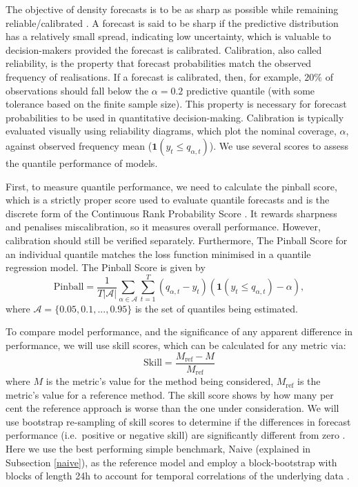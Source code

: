 \documentclass[]{elsarticle} %
\begin{document}
The objective of density forecasts is to be as sharp as possible while
remaining reliable/calibrated \citep{gneiting2007probabilistic}. A forecast
is said to be sharp if the predictive distribution has a relatively
small spread, indicating low uncertainty, which is valuable to
decision-makers provided the forecast is calibrated. Calibration, also
called reliability, is the property that forecast probabilities match
the observed frequency of realisations. If a forecast is calibrated,
then, for example, \(20\%\) of observations should fall below the
\(\alpha=0.2\) predictive quantile (with some tolerance based on the
finite sample size). This property is necessary for forecast
probabilities to be used in quantitative decision-making. Calibration is
typically evaluated visually using reliability diagrams, which plot the
nominal coverage, \(\alpha\), against observed frequency mean
(\(\mathbf{1}(y_{t}\leq q_{\alpha,t})\)). We use several scores to assess
the quantile performance of models.

First, to measure quantile performance, we need to calculate the pinball
score, which is a strictly proper score used to evaluate quantile
forecasts and is the discrete form of the Continuous Rank Probability
Score \citep{hyndman2021forecasting}. It rewards sharpness and penalises
miscalibration, so it measures overall performance. However, calibration
should still be verified separately. Furthermore, The Pinball Score for
an individual quantile matches the loss function minimised in a quantile
regression model. The Pinball Score is given by \begin{equation}
    \text{Pinball} = 
    \frac{1}{T|\mathcal{A}|} \sum_{\alpha \in \mathcal{A}} \sum_{t=1}^T
 \left(q_{\alpha,t} - y_{t} \right)
 \left(\mathbf{1}(y_{t}\leq q_{\alpha,t})-\alpha \right) ,
 \label{eq:pinball}
\end{equation} where \(\mathcal{A} = \{0.05,0.1,...,0.95\}\) is the set of
quantiles being estimated.

To compare model performance, and the significance of any apparent
difference in performance, we will use skill scores, which can be
calculated for any metric via: \begin{equation}
  \mathrm{Skill} = \frac{M_\mathrm{ref} - M}{M_\mathrm{ref}} \label{eq:skillscore}
\end{equation} where \(M\) is the metric's value for the method being
considered, \(M_\mathrm{ref}\) is the metric's value for a reference
method. The skill score shows by how many per cent the reference
approach is worse than the one under consideration. We will use
bootstrap re-sampling of skill scores to determine if the differences in
forecast performance (i.e.~positive or negative skill) are significantly
different from zero \citep{Efron1981Bootstrap}. Here we use the best
performing simple benchmark, Naive (explained in Subsection
\ref{naive}), as the reference model and employ a block-bootstrap
with blocks of length 24h to account for temporal correlations of the
underlying data \citep{hongyi1996bootstrapping, Bergmeir2016303}.
\end{document}
